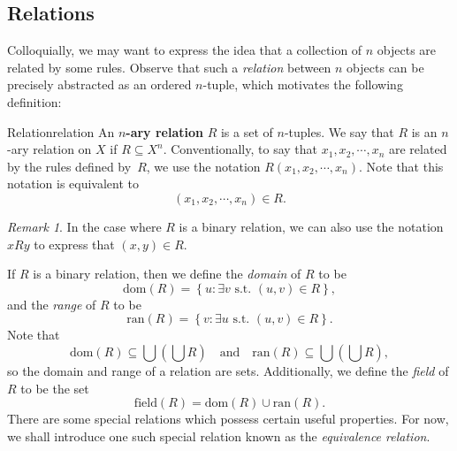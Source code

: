 \documentclass[math]{amznotes}
\theoremstyle{remark}
\newtheorem*{remark}{Remark}
\begin{document}
\subsection{Relations}
Colloquially, we may want to express the idea that a collection of $n$ objects are related by some rules. Observe that such a \textit{relation} between $n$ objects can be precisely abstracted as an ordered $n$-tuple, which motivates the following definition:
\begin{dfnbox}{Relation}{relation}
    An {\color{red} \textbf{$n$-ary relation}} $R$ is a set of $n$-tuples. We say that $R$ is an $n$-ary relation on $X$ if $R \subseteq X^n$. Conventionally, to say that $x_1, x_2, \cdots, x_n$ are related by the rules defined by~$R$, we use the notation $R(x_1, x_2, \cdots, x_n)$. Note that this notation is equivalent to 
    \begin{displaymath}
        (x_1, x_2, \cdots, x_n) \in R.
    \end{displaymath}
\end{dfnbox}
\begin{notebox}
    \begin{remark}
        In the case where $R$ is a binary relation, we can also use the notation $xRy$ to express that $(x, y) \in R$.
    \end{remark}
\end{notebox}
If $R$ is a binary relation, then we define the \textit{domain} of $R$ to be
\begin{displaymath}
    \mathrm{dom}(R) = \left\{u \colon \exists v \textrm{ s.t. } (u, v) \in R\right\},
\end{displaymath}
and the \textit{range} of $R$ to be
\begin{displaymath}
    \mathrm{ran}(R) = \left\{v \colon \exists u \textrm{ s.t. } (u, v) \in R\right\}.
\end{displaymath}
Note that
\begin{displaymath}
    \mathrm{dom}(R) \subseteq \bigcup \left(\bigcup R\right) \quad \textrm{and} \quad \mathrm{ran}(R) \subseteq \bigcup \left(\bigcup R\right),
\end{displaymath}
so the domain and range of a relation are sets. Additionally, we define the \textit{field} of $R$ to be the set
\begin{displaymath}
    \mathrm{field}(R) = \mathrm{dom}(R) \cup \mathrm{ran}(R).
\end{displaymath}
There are some special relations which possess certain useful properties. For now, we shall introduce one such special relation known as the \textit{equivalence relation}.
\end{document}
